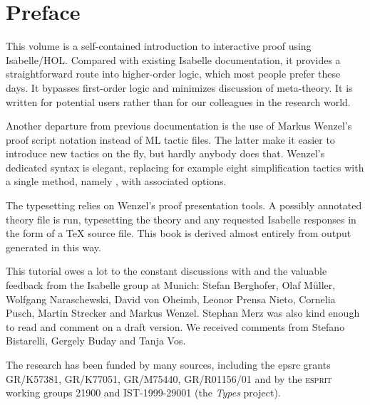 \chapter*{Preface}

This volume is a self-contained introduction to interactive proof using
Isabelle/HOL\@.  Compared with existing Isabelle documentation, it
provides a straightforward route into higher-order logic, which most
people prefer these days. It bypasses first-order logic and minimizes
discussion of meta-theory.  It is written for potential users rather
than for our colleagues in the research world.

Another departure from previous documentation is the use of Markus
Wenzel's proof script notation instead of ML tactic files.  The latter
make it easier to introduce new tactics on the fly, but hardly anybody
does that.  Wenzel's dedicated syntax is elegant, replacing for example
eight simplification tactics with a single method, namely ,
with associated options.

The typesetting relies on Wenzel's proof presentation tools.  A possibly
annotated theory file is run, typesetting the theory and any requested
Isabelle responses in the form of a \TeX{} source file.  This book is
derived almost entirely from output generated in this way.

This tutorial owes a lot to the constant discussions with and the valuable
feedback from the Isabelle group at Munich: Stefan Berghofer, Olaf M{\"u}ller,
Wolfgang Naraschewski, David von Oheimb, Leonor Prensa Nieto, Cornelia Pusch,
Martin Strecker and Markus Wenzel. Stephan Merz was also kind enough to
read and comment on a draft version.  We received comments from Stefano
Bistarelli, Gergely Buday and Tanja Vos.

The research has been funded by many sources, including the {\sc epsrc} 
grants  GR\slash K57381, GR\slash K77051,
GR\slash M75440, GR\slash R01156\slash 01 and by the \textsc{esprit} 
working groups 21900 and IST-1999-29001 (the \emph{Types} project).
